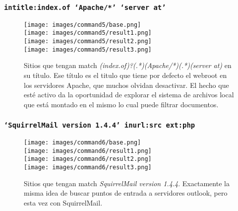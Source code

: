 \documentclass[11pt]{utalcaDoc}
\begin{document}
\subsubsection{\texttt{intitle:index.of \enquote*{Apache/*} \enquote*{server at}}}
\begin{figure}[H]
	\centering
\begin{multicols}{4}
	\texttt{[image: images/command5/base.png]}\\
	\texttt{[image: images/command5/result1.png]}\\
	\texttt{[image: images/command5/result2.png]}\\
	\texttt{[image: images/command5/result3.png]}\\
\end{multicols}
\caption{Sitios que tengan match \textit{(index.of)?(.*)(Apache/*)(.*)(server at)} en su título. Ese título es el titulo que tiene por defecto el webroot en los servidores Apache, que muchos olvidan desactivar. El hecho que esté activo da la oportunidad de explorar el sistema de archivos local que está montado en el mismo lo cual puede filtrar documentos.}
\label{FIG:command5}
\end{figure}



\subsubsection{\texttt{\enquote*{SquirrelMail version 1.4.4} inurl:src ext:php}}
\begin{figure}[H]
	\centering
\begin{multicols}{4}
	\texttt{[image: images/command6/base.png]}\\
	\texttt{[image: images/command6/result1.png]}\\
	\texttt{[image: images/command6/result2.png]}\\
	\texttt{[image: images/command6/result3.png]}\\
\end{multicols}
\caption{Sitios que tengan match \textit{SquirrelMail version 1.4.4}. Exactamente la misma idea de buscar puntos de entrada a servidores outlook, pero esta vez con SquirrelMail.}
\label{FIG:command6}
\end{figure}
\end{document}

